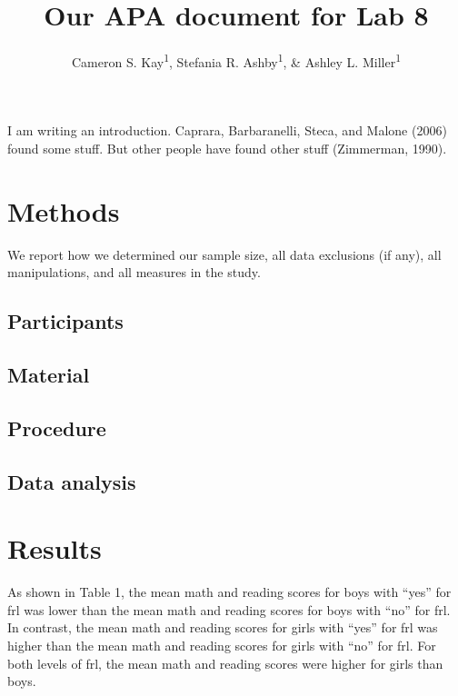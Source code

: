 \documentclass[man,floatsintext]{apa6}
\title{Our APA document for Lab 8}
\author{Cameron S. Kay\textsuperscript{1}, Stefania R. Ashby\textsuperscript{1},
\& Ashley L. Miller\textsuperscript{1}}
\date{}
\affiliation{
\vspace{0.5cm}
\textsuperscript{1} University of Oregon}
\begin{document}
\maketitle

I am writing an introduction. Caprara, Barbaranelli, Steca, and Malone
(2006) found some stuff. But other people have found other stuff
(Zimmerman, 1990).

\newpage

\section{Methods}\label{methods}

We report how we determined our sample size, all data exclusions (if
any), all manipulations, and all measures in the study.

\subsection{Participants}\label{participants}

\subsection{Material}\label{material}

\subsection{Procedure}\label{procedure}

\subsection{Data analysis}\label{data-analysis}

\newpage

\section{Results}\label{results}

As shown in Table 1, the mean math and reading scores for boys with
\enquote{yes} for frl was lower than the mean math and reading scores
for boys with \enquote{no} for frl. In contrast, the mean math and
reading scores for girls with \enquote{yes} for frl was higher than the
mean math and reading scores for girls with \enquote{no} for frl. For
both levels of frl, the mean math and reading scores were higher for
girls than boys.
\end{document}

